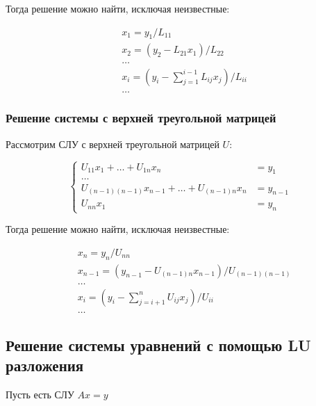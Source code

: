Тогда решение можно найти, исключая неизвестные:

\begin{equation*}
\begin{aligned}
    &x_1 = y_1 / L_{11}\\
    &x_2 = (y_2 - L_{21}x_1) / L_{22}\\
    &\ldots\\
    &x_i = \left(y_i - \sum\limits_{j = 1}^{i - 1} L_{ij}x_j\right) / L_{ii}\\
    &\ldots
\end{aligned}
\end{equation*}

\subsubsection*{Решение системы с верхней треугольной матрицей}

Рассмотрим СЛУ с верхней треугольной матрицей $U$:

\begin{equation*}\label{upperTrigSLE}
    \begin{cases}
        U_{11}x_1 + \ldots + U_{1n}x_n &= y_1\\
        \ldots\\
        U_{(n-1)(n-1)}x_{n-1} + \ldots + U_{(n-1)n}x_{n} &= y_{n-1}\\
        U_{nn}x_1 &= y_n
    \end{cases}
\end{equation*}


Тогда решение можно найти, исключая неизвестные:

\begin{equation*}
\begin{aligned}
    &x_n = y_n / U_{nn}\\
    &x_{n-1} = (y_{n-1} - U_{(n-1)n}x_{n-1}) / U_{(n-1)(n-1)}\\
    &\ldots\\
    &x_i = \left(y_i - \sum\limits_{j = i+1}^n U_{ij}x_j\right) / U_{ii}\\
    &\ldots
\end{aligned}
\end{equation*}

\subsection{Решение системы уравнений с помощью LU разложения}

Пусть есть СЛУ $Ax = y$

